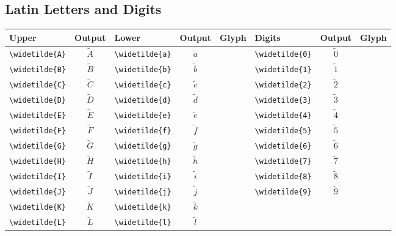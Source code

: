 \documentclass[12pt,a4paper]{article}
\begin{document}
\subsection*{Latin Letters and Digits}
\begin{longtable}{|l|c|l|c|c|l|c|c|}
\hline
\textbf{Upper}       & \textbf{Output} & \textbf{Lower}       & \textbf{Output} & \textbf{Glyph} & \textbf{Digits}      & \textbf{Output} & \textbf{Glyph} \\
\hline
\verb|\widetilde{A}| & $\widetilde{A}$ & \verb|\widetilde{a}| & $\widetilde{a}$ &                & \verb|\widetilde{0}| & $\widetilde{0}$ & \\
\verb|\widetilde{B}| & $\widetilde{B}$ & \verb|\widetilde{b}| & $\widetilde{b}$ &                & \verb|\widetilde{1}| & $\widetilde{1}$ & \\
\verb|\widetilde{C}| & $\widetilde{C}$ & \verb|\widetilde{c}| & $\widetilde{c}$ &                & \verb|\widetilde{2}| & $\widetilde{2}$ & \\
\verb|\widetilde{D}| & $\widetilde{D}$ & \verb|\widetilde{d}| & $\widetilde{d}$ &                & \verb|\widetilde{3}| & $\widetilde{3}$ & \\
\verb|\widetilde{E}| & $\widetilde{E}$ & \verb|\widetilde{e}| & $\widetilde{e}$ &                & \verb|\widetilde{4}| & $\widetilde{4}$ & \\
\verb|\widetilde{F}| & $\widetilde{F}$ & \verb|\widetilde{f}| & $\widetilde{f}$ &                & \verb|\widetilde{5}| & $\widetilde{5}$ & \\
\verb|\widetilde{G}| & $\widetilde{G}$ & \verb|\widetilde{g}| & $\widetilde{g}$ &                & \verb|\widetilde{6}| & $\widetilde{6}$ & \\
\verb|\widetilde{H}| & $\widetilde{H}$ & \verb|\widetilde{h}| & $\widetilde{h}$ &                & \verb|\widetilde{7}| & $\widetilde{7}$ & \\
\verb|\widetilde{I}| & $\widetilde{I}$ & \verb|\widetilde{i}| & $\widetilde{i}$ &                & \verb|\widetilde{8}| & $\widetilde{8}$ & \\
\verb|\widetilde{J}| & $\widetilde{J}$ & \verb|\widetilde{j}| & $\widetilde{j}$ &                & \verb|\widetilde{9}| & $\widetilde{9}$ & \\
\verb|\widetilde{K}| & $\widetilde{K}$ & \verb|\widetilde{k}| & $\widetilde{k}$ &                &                      &                 & \\
\verb|\widetilde{L}| & $\widetilde{L}$ & \verb|\widetilde{l}| & $\widetilde{l}$ &                &                      &                 & \\

\end{longtable}
\end{document}
